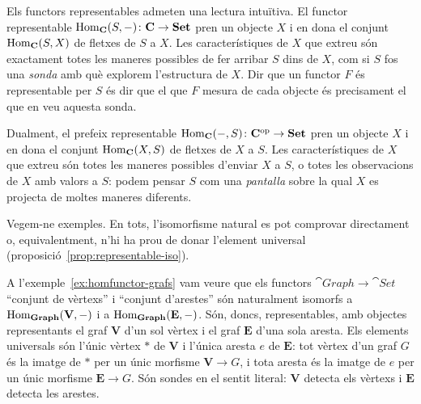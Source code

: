 \begin{observacio}\label{obs:sondes-pantalles}
Els functors representables admeten una lectura intuïtiva. El functor representable $\operatorname{Hom}_{\mathbf{C}}(S,-)\colon\mathbf{C}\to\mathbf{Set}$ pren un objecte $X$ i en dona el conjunt $\operatorname{Hom}_{\mathbf{C}}(S,X)$ de fletxes de $S$ a $X$. Les característiques de $X$ que extreu són exactament totes les maneres possibles de fer arribar $S$ dins de $X$, com si $S$ fos una \emph{sonda} amb què explorem l'estructura de $X$. Dir que un functor $F$ és representable per $S$ és dir que el que $F$ mesura de cada objecte és precisament el que en veu aquesta sonda.

Dualment, el prefeix representable $\operatorname{Hom}_{\mathbf{C}}(-,S)\colon\mathbf{C}^{\mathrm{op}}\to\mathbf{Set}$ pren un objecte $X$ i en dona el conjunt $\operatorname{Hom}_{\mathbf{C}}(X,S)$ de fletxes de $X$ a $S$. Les característiques de $X$ que extreu són totes les maneres possibles d'enviar $X$ a $S$, o totes les observacions de $X$ amb valors a $S$: podem pensar $S$ com una \emph{pantalla} sobre la qual $X$ es projecta de moltes maneres diferents.
\end{observacio}

Vegem-ne exemples. En tots, l'isomorfisme natural es pot comprovar directament o, equivalentment, n'hi ha prou de donar l'element universal (proposició~\ref{prop:representable-iso}).

\begin{exemple}\label{ex:rep-grafs}
A l'exemple~\ref{ex:homfunctor-grafs} vam veure que els functors $\cat{Graph}\to\cat{Set}$ \enquote{conjunt de vèrtexs} i \enquote{conjunt d'arestes} són naturalment isomorfs a $\operatorname{Hom}_{\mathbf{Graph}}(\mathbf V,-)$ i a $\operatorname{Hom}_{\mathbf{Graph}}(\mathbf E,-)$. Són, doncs, representables, amb objectes representants el graf $\mathbf V$ d'un sol vèrtex i el graf $\mathbf E$ d'una sola aresta. Els elements universals són l'únic vèrtex $\ast$ de $\mathbf V$ i l'única aresta $e$ de $\mathbf E$: tot vèrtex d'un graf $G$ és la imatge de $\ast$ per un únic morfisme $\mathbf V\to G$, i tota aresta és la imatge de $e$ per un únic morfisme $\mathbf E\to G$. Són sondes en el sentit literal: $\mathbf V$ detecta els vèrtexs i $\mathbf E$ detecta les arestes.
\end{exemple}

